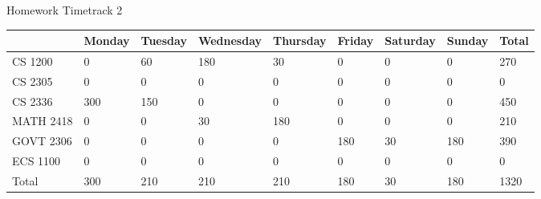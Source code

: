 \documentclass [11pt] {article}
\begin{document}
\begin {center}

    Homework Timetrack 2 \\

    \begin {tabular} {|l|l|l|l|l|l|l|l|l|}

        \hline
                    & Monday    & Tuesday   & Wednesday     & Thursday  & Friday    & Saturday  & Sunday    & Total \\ 
        \hline
        CS 1200     & 0         & 60        & 180           & 30        & 0         & 0         & 0         & 270   \\
        \hline
        CS 2305     & 0         & 0         & 0             & 0         & 0         & 0         & 0         & 0     \\
        \hline
        CS 2336     & 300       & 150       & 0             & 0         & 0         & 0         & 0         & 450   \\
        \hline
        MATH 2418   & 0         & 0         & 30            & 180       & 0         & 0         & 0         & 210   \\
        \hline
        GOVT 2306   & 0         & 0         & 0             & 0         & 180       & 30        & 180       & 390   \\
        \hline
        ECS 1100    & 0         & 0         & 0             & 0         & 0         & 0         & 0         & 0     \\
        \hline
        Total       & 300       & 210       & 210           & 210       & 180       & 30        & 180       & 1320   \\
        \hline

    \end {tabular}	

\end {center}
\end{document}
